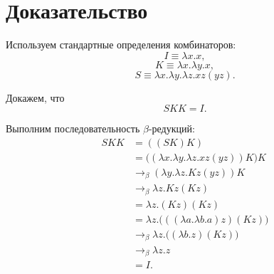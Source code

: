 \documentclass[12pt]{article}
\begin{document}
\section*{Доказательство}

Используем стандартные определения комбинаторов:
\[
I \equiv \lambda x.x,
\]
\[
K \equiv \lambda x.\lambda y.x,
\]
\[
S \equiv \lambda x.\lambda y.\lambda z.xz(yz).
\]

Докажем, что
\[
S K K = I.
\]

Выполним последовательность $\beta$-редукций:
\[
\begin{aligned}
S K K
&= ((S K) K) \\[4pt]
&= \bigl((\lambda x.\lambda y.\lambda z.xz(yz))K\bigr)K \\[4pt]
&\to_{\beta} (\lambda y.\lambda z.Kz(yz))K \\[4pt]
&\to_{\beta} \lambda z.Kz(Kz) \\[4pt]
&= \lambda z.(Kz)(Kz) \\[4pt]
&= \lambda z.\bigl(((\lambda a.\lambda b.a)z)(Kz)\bigr) \\[4pt]
&\to_{\beta} \lambda z.\bigl((\lambda b.z)(Kz)\bigr) \\[4pt]
&\to_{\beta} \lambda z.z \\[4pt]
&= I.
\end{aligned}
\]
\end{document}

